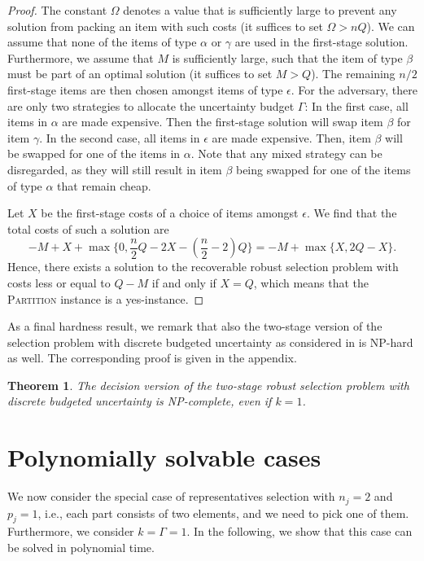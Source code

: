 \documentclass[a4paper,11pt,abstracton]{scrartcl}
\newtheorem{theorem}{Theorem}%
\theoremstyle{definition}
\theoremstyle{remark}
\newcommand{\bigM}{\Omega}
\begin{document}
\begin{proof}
The constant $\bigM$ denotes a value that is sufficiently large to prevent any solution from packing an item with such costs (it suffices to set $\bigM > nQ$).
We can assume that none of the items of type $\alpha$ or $\gamma$ are used in the first-stage solution. Furthermore, we assume that $M$ is sufficiently large, such that the item of type $\beta$ must be part of an optimal solution (it suffices to set $M > Q$). The remaining $n/2$ first-stage items are then chosen amongst items of type $\epsilon$. For the adversary, there are only two strategies to allocate the uncertainty budget $\Gamma$: In the first case, all items in $\alpha$ are made expensive. Then the first-stage solution will swap item $\beta$ for item $\gamma$. In the second case, all items in $\epsilon$ are made expensive. Then, item $\beta$ will be swapped for one of the items in $\alpha$. Note that any mixed strategy can be disregarded, as they will still result in item $\beta$ being swapped for one of the items of type $\alpha$ that remain cheap.

Let $X$ be the first-stage costs of a choice of items amongst $\epsilon$. We find that the total costs of such a solution are
\[ -M + X + \max\{ 0, \frac{n}{2}Q-2X-(\frac{n}{2}-2)Q\} = -M + \max\{ X, 2Q-X\}. \]
Hence, there exists a solution to the recoverable robust selection problem with costs less or equal to $Q-M$ if and only if $X=Q$, which means that the \textsc{Partition} instance is a yes-instance.

\end{proof}

As a final hardness result, we remark that also the two-stage version of the selection problem with discrete budgeted uncertainty as considered in \cite{chassein2018recoverable} is NP-hard as well. The corresponding proof is given in the appendix.

\begin{theorem}\label{th:hardness3}
The decision version of the two-stage robust selection problem with discrete budgeted uncertainty is NP-complete, even if $k=1$.
\end{theorem}


\section{Polynomially solvable cases}

\label{sec:special}

We now consider the special case of representatives selection with $n_j=2$ and $p_j=1$, i.e., each part consists of two elements, and we need to pick one of them. Furthermore, we consider $k=\Gamma=1$. In the following, we show that this case can be solved in polynomial time. 
\end{document}
